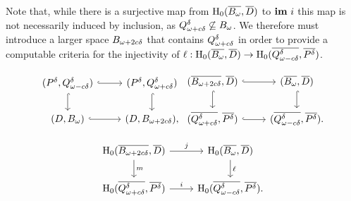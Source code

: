 Note that, while there is a surjective map from $\mathrm{H}_0(\overline{B_{\omega}}, \overline{D})$ to $\mathbf{im}~i$ this map is not necessarily induced by inclusion, as $Q_{\omega + c{\delta}}^{\delta}\not\subseteq B_{\omega}$.
We therefore must introduce a larger space $B_{\omega + 2c{\delta}}$ that contains $Q_{\omega + c{\delta}}^{\delta}$ in order to provide a computable criteria for the injectivity of $\ell : \mathrm{H}_0(\overline{B_{\omega}}, \overline{D})\to\mathrm{H}_0(\overline{Q_{\omega - c{\delta}}^{\delta}}, \overline{P^{{\delta}}})$.

\[ \begin{tikzcd}
  (\P, \Q^\of) \arrow[hookrightarrow]{r}\arrow[hookrightarrow]{d} &
  (\P, \QQ^\of) \arrow[hookrightarrow]{d} \\
  (D, \bb) \arrow[hookrightarrow]{r} &
  (D, \BB),
\end{tikzcd}\begin{tikzcd}
  (\cmp{\BB},\cmp{D})\arrow[hookrightarrow]{d}\arrow[hookrightarrow]{r} & %
  (\cmp{\bb}, \cmp{D}) \arrow[hookrightarrow]{d}\\
  (\cmp{\QQ^\of}, \cmp{\P}) \arrow[hookrightarrow]{r} & %
  (\cmp{\Q^\of}, \cmp{\P}).
\end{tikzcd}\]

\begin{equation}\label{dgm:1}\begin{tikzcd}
  \hom_0(\cmp{\BB},\cmp{D})\arrow{d}{m} \arrow{r}{j} & %
  \hom_0(\cmp{\bb}, \cmp{D}) \arrow{d}{\ell} \\
  \hom_0(\cmp{\QQ^\of}, \cmp{\P}) \arrow{r}{i} & %
  \hom_0(\cmp{\Q^\of}, \cmp{\P}).
\end{tikzcd}\end{equation}

